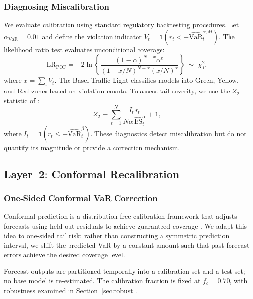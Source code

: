 \documentclass[preprint,11pt,authoryear]{elsarticle}
\newcommand{\VaR}{\mathrm{VaR}}
\newcommand{\ES}{\mathrm{ES}}
\newcommand{\1}{\boldsymbol{1}}
\begin{document}
	\subsubsection{Diagnosing Miscalibration}
	\label{sec:diag}
	
	We evaluate calibration using standard regulatory backtesting
	procedures. Let $\alpha_{\mathrm{VaR}} = 0.01$ and define the
	violation indicator
	$V_t = \1(r_t < -\widehat{\VaR}_t^{\alpha;M})$. The
	\citet{kupiec1995} likelihood ratio test evaluates
	unconditional coverage:
	\begin{equation}
		\label{eq:kupiec}
		\mathrm{LR}_{\mathrm{POF}} = -2\ln\!\left\{
		\frac{(1-\alpha)^{N-x}\alpha^x}
		{(1-x/N)^{N-x}(x/N)^x}\right\}
		\;\sim\; \chi^2_1,
	\end{equation}
	where $x = \sum_t V_t$. The Basel Traffic Light
	\citep{basel1996} classifies models into Green, Yellow, and
	Red zones based on violation counts. To assess tail severity,
	we use the $Z_2$ statistic of \citet{acerbi2014back}:
	\begin{equation}
		\label{eq:Z2}
		Z_2 = \sum_{t=1}^N
		\frac{I_t\, r_t}{N\alpha\,\widehat{\ES}_t^\alpha} + 1,
	\end{equation}
	where $I_t = \1(r_t \leq -\widehat{\VaR}_t^\beta)$. These
	diagnostics detect miscalibration but do not quantify its
	magnitude or provide a correction mechanism.
	
	\subsection{Layer~2: Conformal Recalibration}
	\label{sec:layer2}
	
	\subsubsection{One-Sided Conformal VaR Correction}
	\label{sec:cqr_var}
	
	Conformal prediction is a distribution-free calibration
	framework that adjusts forecasts using held-out residuals to
	achieve guaranteed coverage
	\citep{vovk2005algorithmic, romano2019conformalized}. We
	adapt this idea to one-sided tail risk: rather than
	constructing a symmetric prediction interval, we shift the
	predicted VaR by a constant amount such that past forecast
	errors achieve the desired coverage level.
	
	Forecast outputs are partitioned temporally into a calibration set and a test set; no base model is re-estimated. The
	calibration fraction is fixed at $f_c = 0.70$, with robustness examined in Section~\ref{sec:robust}.
	
\end{document}
